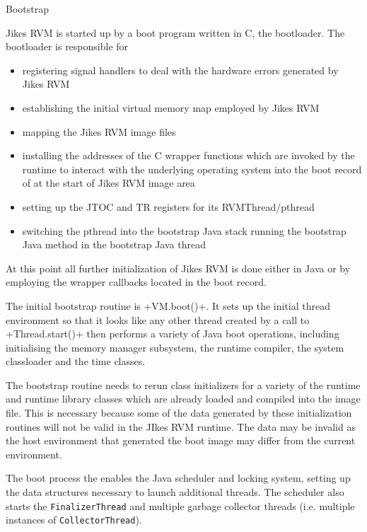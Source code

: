 \begin{section}{Bootstrap}
\label{sec:bootstrap}

Jikes RVM is started up by a boot program written in C, the bootloader. The bootloader is responsible for
\begin{itemize}
  \item registering signal handlers to deal with the hardware errors generated by Jikes RVM
  \item establishing the initial virtual memory map employed by Jikes RVM
  \item mapping the Jikes RVM image files
  \item installing the addresses of the C wrapper functions which are invoked by the runtime to interact with the underlying operating system into the boot record of at the start of Jikes RVM image area
  \item setting up the JTOC and TR registers for its RVMThread/pthread
  \item switching the pthread into the bootstrap Java stack running the bootstrap Java method in the bootstrap Java thread
\end{itemize}

At this point all further initialization of Jikes RVM is done either in Java or by employing the wrapper callbacks located in the boot record.

The initial bootstrap routine is \spverb+VM.boot()+. It sets up the initial thread environment so that it looks like any other thread created by a call to \spverb+Thread.start()+ then performs a variety of Java boot operations, including initialising the memory manager subsystem, the runtime compiler, the system classloader and the time classes.

The bootstrap routine needs to rerun class initializers for a variety of the runtime and runtime library classes which are already loaded and compiled into the image file. This is necessary because some of the data generated by these initialization routines will not be valid in the JIkes RVM runtime. The data may be invalid as the host environment that generated the boot image may differ from the current environment.

The boot process the enables the Java scheduler and locking system, setting up the data structures necessary to launch additional threads. The scheduler also starts the \texttt{Fi\-na\-li\-zer\-Thread} and multiple garbage collector threads (i.e. multiple instances of \texttt{Col\-lec\-tor\-Thread}).


\end{section}
